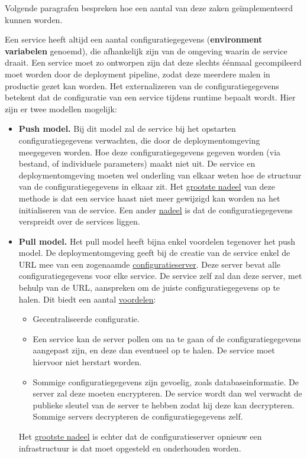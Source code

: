 \documentclass{report}
\begin{document}
	Volgende paragrafen bespreken hoe een aantal van deze zaken geïmplementeerd kunnen worden.

	Een service heeft altijd een aantal configuratiegegevens (\textbf{environment variabelen} genoemd), die afhankelijk zijn van de omgeving waarin de service draait. Een service moet zo ontworpen zijn dat deze slechts éénmaal gecompileerd moet worden door de deployment pipeline, zodat deze meerdere malen in productie gezet kan worden. Het externalizeren van de configuratiegegevens betekent dat de configuratie van een service tijdens runtime bepaalt wordt. Hier zijn er twee modellen mogelijk:
	\begin{itemize}
		\item \textbf{Push model.} Bij dit model zal de service bij het opstarten configuratiegegevens verwachten, die door de deploymentomgeving meegegeven worden. Hoe deze configuratiegegevens gegeven worden (via bestand, of individuele parameters) maakt niet uit. De service en deploymentomgeving moeten wel onderling van elkaar weten hoe de structuur van de configuratiegegevens in elkaar zit. Het \underline{grootste nadeel} van deze methode is dat een service haast niet meer gewijzigd kan worden na het initialiseren van de service. Een ander \underline{nadeel} is dat de configuratiegegevens verspreidt over de services liggen.
		\item \textbf{Pull model.} Het pull model heeft bijna enkel voordelen tegenover het push model. De deploymentomgeving geeft bij de creatie van de service enkel de URL mee van een zogenaamde \underline{configuratieserver}. Deze server bevat alle configuratiegegevens voor elke service. De service zelf zal dan deze server, met behulp van de URL, aanspreken om de juiste configuratiegegevens op te halen. Dit biedt een aantal \underline{voordelen}:
		\begin{itemize}
			\item Gecentraliseerde configuratie.
			\item Een service kan de server pollen om na te gaan of de configuratiegegevens aangepast zijn, en deze dan eventueel op te halen. De service moet hiervoor niet herstart worden.
			\item Sommige configuratiegegevens zijn gevoelig, zoals databaseinformatie. De server zal deze moeten encrypteren. De service wordt dan wel verwacht de publieke sleutel van de server te hebben zodat hij deze kan decrypteren. Sommige servers decrypteren de configuratiegegevens zelf.
		\end{itemize}
		Het \underline{grootste nadeel} is echter dat de configuratieserver opnieuw een infrastructuur is dat moet opgesteld en onderhouden worden.
	\end{itemize}
\end{document}
